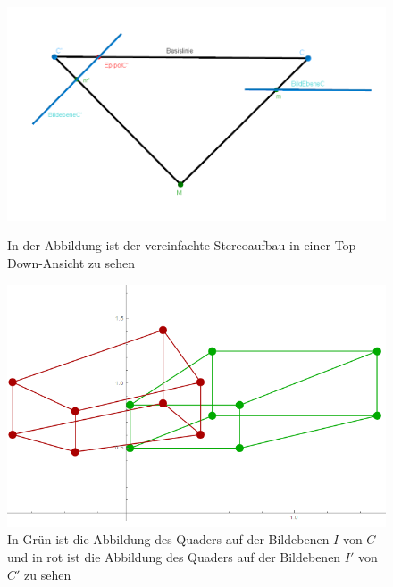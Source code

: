 
\begin{figure}[!htb]
	\includegraphics[width=\linewidth]{images/AufbauMinimalbeispiel.png}
	\caption{In der Abbildung ist der vereinfachte Stereoaufbau in einer Top-Down-Ansicht zu sehen}
	\label{fig:aufbauMinimalTopDown}
	\endminipage\hfill
	\includegraphics[width=\linewidth]{images/QuadrateMinimalBeispiel.png}
	\caption{In Grün ist die Abbildung des Quaders auf der Bildebenen $I$ von $C$ und in rot ist die Abbildung des Quaders auf der Bildebenen $I'$ von $C'$ zu sehen}
	\label{fig:AbbildungenMinimal}
	\endminipage\hfill
\end{figure}


